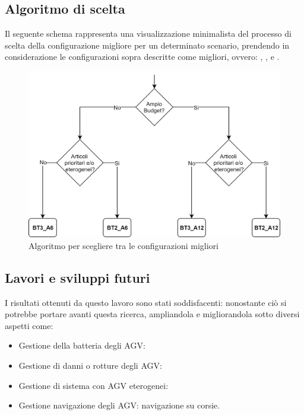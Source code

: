 \documentclass[12pt]{article}
\begin{document}
\subsection{Algoritmo di scelta}
Il seguente schema rappresenta una visualizzazione minimalista del processo di scelta della configurazione migliore per un determinato scenario, prendendo in considerazione le configurazioni sopra descritte come migliori, ovvero: , ,  e . 
\begin{figure}[H]
\centering
  \includegraphics[width=1\linewidth]{Figures/Scelta_Config/Algoritmo_Scelta_Config.png}
  \caption{Algoritmo per scegliere tra le configurazioni migliori}\label{fig:algoritmo_scelta}
\end{figure}

\subsection{Lavori e sviluppi futuri}
I risultati ottenuti da questo lavoro sono stati soddisfacenti: nonostante ciò si potrebbe portare avanti questa ricerca, ampliandola e migliorandola sotto diversi aspetti come:
\begin{itemize}
\setlength\itemsep{0.1em}
\item Gestione della batteria degli AGV:
\item Gestione di danni o rotture degli AGV:
\item Gestione di sistema con AGV eterogenei:
\item Gestione navigazione degli AGV: navigazione su corsie.
\end{itemize}

\newpage


\end{document}

